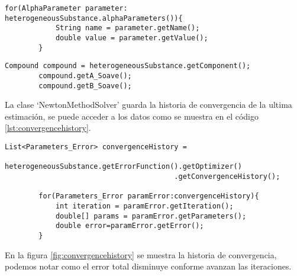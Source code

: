 	\begin{lstlisting}[label={lst:readvalues},caption={Lectura de los parámetros a través de la substancia heterogénea.}]
		for(AlphaParameter parameter: heterogeneousSubstance.alphaParameters()){
			String name = parameter.getName();
			double value = parameter.getValue();
		}
	\end{lstlisting}

	\begin{lstlisting}[label={lst:readvaluesFromCompound},caption={Lectura de los parámetros a través del compuesto puro para la expresión $\alpha$ Soave de dos parámetros \ref{eq:soaveR}}]
		Compound compound = heterogeneousSubstance.getComponent();
		compound.getA_Soave();
		compound.getB_Soave();
	\end{lstlisting}



	La clase `NewtonMethodSolver' guarda la historia de convergencia de la ultima estimación, se puede acceder a los datos como se muestra en el código \ref{lst:convergencehistory}.

	\begin{lstlisting}[label={lst:convergencehistory},caption={Lectura de la historia de convergencia}]
		List<Parameters_Error> convergenceHistory = 
					heterogeneousSubstance.getErrorFunction().getOptimizer()
										.getConvergenceHistory();
		
		for(Parameters_Error paramError:convergenceHistory){
			int iteration = paramError.getIteration();
			double[] params = paramError.getParameters();
			double error=paramError.getError();
		}
	\end{lstlisting}


	En la figura \ref{fig:convergencehistory} se muestra la historia de convergencia, podemos notar como el error total disminuye conforme avanzan las iteraciones.




